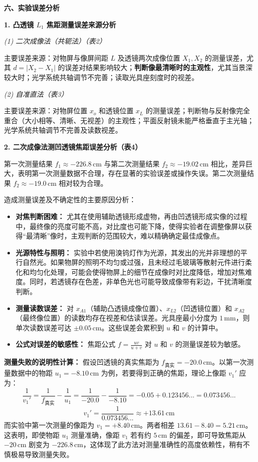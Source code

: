 ﻿\documentclass[12pt,a4paper]{article}
\newcommand{\rmcm}{\mathrm{\,cm}}
\newcommand{\rmmm}{\mathrm{\,mm}}
\begin{document}
\vspace{0.5cm}
\noindent\textbf{六、实验误差分析}

\noindent\textbf{1. 凸透镜 $L_1$ 焦距测量误差来源分析}

\noindent\textit{(1) 二次成像法（共轭法）（表2）}
\par 主要误差来源：对物屏与像屏间距 $L$ 及透镜两次成像位置 $X_1, X_2$ 的测量误差，尤其 $d = |X_2 - X_1|$ 的误差对结果影响较大；\textbf{判断像最清晰时的主观性}，尤其当景深较大时；光学系统共轴调节不完善；读取光具座刻度时的视差。

\noindent\textit{(2) 自准直法（表3）}
\par 主要误差来源：对物屏位置 $x_o$ 和透镜位置 $x_L$ 的测量误差；判断物与反射像完全重合（大小相等、清晰、无视差）的主观性；平面反射镜未能严格垂直于主光轴；光学系统共轴调节不完善及读数视差。

\noindent\textbf{2. 二次成像法测凹透镜焦距误差分析（表4）}
\par 第一次测量结果 $f_1 \approx -226.8 \rmcm$ 与第二次测量结果 $f_2 \approx -19.02 \rmcm$ 相比，差异巨大，表明第一次测量数据不合理，存在显著的实验误差或操作失误。第二次测量结果 $f_2 \approx -19.0 \rmcm$ 相对较为合理。
\par 造成测量误差及不确定性的主要原因分析：
\begin{itemize}
    \item \textbf{对焦判断困难：} 尤其在使用辅助透镜形成虚物，再由凹透镜形成实像的过程中，最终像的亮度可能不高，对比度也可能下降，使得实验者在调整像屏以获得“最清晰”像时，主观判断的范围较大，难以精确确定最佳成像点。
    \item \textbf{光源特性与照明：} 实验中若使用溴钨灯作为光源，其发出的光并非理想的平行自然光。如果物屏的照明不均匀或过强，且未经过毛玻璃等散射元件进行柔化和均匀化处理，可能会使得物屏上的细节在成像时对比度降低，增加对焦难度。同时，若透镜存在色差，非单色光也可能导致成像带有彩边，干扰清晰度判断。
    \item \textbf{测量读数误差：} 对 $x_{A1}$（辅助凸透镜成像位置）、$x_{L2}$（凹透镜位置）和 $x_{A2}$（最终像位置）的读数均存在视差和估读误差。光具座最小分度为 $1 \rmmm$，则单次读数误差可达 $\pm 0.05 \rmcm$。这些误差会累积到 $u$ 和 $v$ 的计算中。
    \item \textbf{公式对误差的敏感性：} 焦距公式 $f = \frac{uv}{u+v}$ 对 $u$ 和 $v$ 的测量误差较为敏感。
\end{itemize}
\par \textbf{测量失败的说明性计算：} 假设凹透镜的真实焦距为 $f_{\text{真实}} = -20.0 \rmcm$。以第一次测量数据中的物距 $u_1 = -8.10 \rmcm$ 为例，若要得到正确的焦距，理论上像距 $v_1'$ 应为：
\begin{equation*}
\frac{1}{v_1'} = \frac{1}{f_{\text{真实}}} - \frac{1}{u_1} = \frac{1}{-20.0} - \frac{1}{-8.10} = -0.05 + 0.123456... = 0.073456...
\end{equation*}
\begin{equation*}
v_1' = \frac{1}{0.073456...} \approx +13.61 \rmcm
\end{equation*}
而实验中第一次测量的像距为 $v_1 = +8.40 \rmcm$。两者相差 $13.61 - 8.40 = 5.21 \rmcm$。这表明，即使物距 $u_1$ 测量准确，像距 $v_1$ 若有约 $5 \rmcm$ 的偏差，即可导致焦距从 $-20 \rmcm$ 剧变为 $-226.8 \rmcm$，这体现了此方法对测量准确性的高度依赖性，稍有不慎极易导致测量失败。
\end{document}

